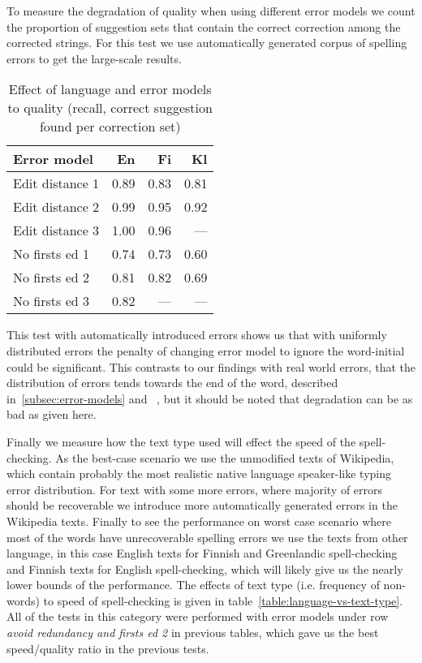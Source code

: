 \documentclass[11pt]{article}
\begin{document}
To measure the degradation of quality when using different error models we
count the proportion of suggestion sets that contain the correct correction
among the corrected strings. For this test we use automatically generated corpus
of spelling errors to get the large-scale results.

\begin{table}[h]
\begin{center}
\begin{scriptsize}
\begin{tabular}{|l|rrr|}
\hline
\bf Error model & \bf En & \bf Fi & \bf Kl\\ 
\hline
\hline
\hline
Edit distance 1 &
0.89&0.83&0.81
\\
Edit distance 2 &
0.99&0.95&0.92
\\
Edit distance 3 &
1.00&0.96&---
\\
No firsts ed 1 & 
0.74&0.73&0.60
\\
No firsts ed 2 &
0.81&0.82&0.69
\\
No firsts ed 3 &
0.82&---&---
\\
\hline
\end{tabular}
\end{scriptsize}
\end{center}
\caption{\label{table:error-model-vs-language} Effect of language and 
error models to quality (recall, correct suggestion found per
correction set)}
\end{table}

This test with automatically introduced errors shows us that with uniformly
distributed errors the penalty of changing error model to ignore the
word-initial could be significant. This contrasts to our findings with real
world errors, that the distribution of errors tends towards the end of the word,
described in~\ref{subsec:error-models} and ~\cite{Bhagat/2007},
but it should be noted that degradation can be as bad as given here.

Finally we measure how the text type used will effect the speed of the
spell-checking. As the best-case scenario we use the unmodified texts of
Wikipedia, which contain probably the most realistic native language
speaker-like typing error distribution. For text with some more errors, where
majority of errors should be recoverable we introduce more automatically
generated errors in the Wikipedia texts. Finally to see the performance on
worst case scenario where most of the words have unrecoverable spelling errors
we use the texts from other language, in this case English texts for Finnish
and Greenlandic spell-checking and Finnish texts for English spell-checking,
which will likely give us the nearly lower bounds of the performance. The
effects of text type (i.e. frequency of non-words) to speed of spell-checking
is given in table~\ref{table:language-vs-text-type}. All of
the tests in this category were performed with error models under row
\emph{avoid redundancy and firsts ed 2} in previous tables, which gave us the
best speed/quality ratio in the previous tests.
\end{document}
